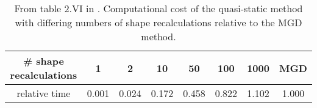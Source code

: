 \documentclass[review]{elsarticle}
\begin{document}
\begin{table}[h]
    \caption{From table 2.VI in \cite{dulla_models_2005}. Computational cost
        of the quasi-static method with differing numbers of shape
        recalculations relative to the MGD method.}
    \label{tbl:dulla_costs}
    \begin{center}
        \begin{tabular}{|c|c|c|c|c|c|c|c|}
            \hline
            \# shape recalculations & 1 & 2 & 10 & 50 & 100 & 1000 & MGD \\
            \hline
            relative time & 0.001 & 0.024 & 0.172 & 0.458 & 0.822 & 1.102 &
                1.000 \\
            \hline
        \end{tabular}
    \end{center}
\end{table}
\end{document}
